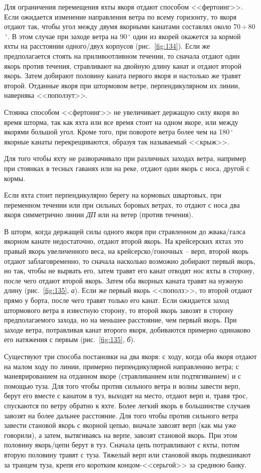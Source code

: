 \documentclass[a4paper, 12pt, twoside, final, book, russian, fittopage, cyremdash]{ncc}
\newcommand{\gr}{\ensuremath{\,^\circ}\xspace}
\newcommand{\otdo}{\,\ensuremath{\div}\,}
\newcommand{\ris}[1]{\ref{fig:#1}}
\begin{document}
Для ограничения перемещения яхты якоря отдают способом <<фертоинг>>. Если ожидается изменение направления ветра по всему горизонту, то якоря отдают так, чтобы угол между двумя якорными канатами составлял около 70\otdo 80\gr. В этом случае при заходе ветра на 90\gr один из якорей окажется за кормой яхты на расстоянии одного\-/двух корпусов (рис.~\ris{134}). Если же предполагается стоять на приливоотливном течении, то сначала отдают один якорь против течения, стравливают на двойную длину канат и отдают второй якорь. Затем добирают половину каната первого якоря и настолько же травят второй. Отданные якоря при штормовом ветре, перпендикулярном их линии, наверняка <<поползут>>.

Стоянка способом <<фертоинг>> не увеличивает держащую силу якоря во время шторма, так как яхта или все время стоит на одном якоре, или между якорями большой угол. Кроме того, при повороте ветра более чем на 180\gr якорные канаты перекрещиваются, образуя так называемый <<крыж>>.

Для того чтобы яхту не разворачивало при различных заходах ветра, например при стоянках в тесных гаванях или на реке, отдают один якорь с носа, другой с кормы.

Если яхта стоит перпендикулярно берегу на кормовых швартовых, при переменном течении или при сильных боровых ветрах, то отдают с носа два якоря симметрично линии \textit{ДП} или на ветер (против течения).

В шторм, когда держащей силы одного якоря при стравленном до жвака\-/галса якорном канате недостаточно, отдают второй якорь. На крейсерских яхтах это правый якорь увеличенного веса, на крейсерско\-/гоночных \--- верп, второй якорь отдают заблаговременно, то сначала насколько возможно добирают первый якорь, но так, чтобы не вырвать его, затем травят его канат отводят нос яхты в сторону, после чего отдают второй якорь. Затем оба якорных каната травят на нужную длину (рис.~\ris{135}, \textit{а}). Если же первый якорь <<пополз>>, то второй отдают прямо у борта, после чего травят только его канат. Если ожидается заход штормового ветра в известную сторону, то второй якорь завозят в сторону предполагаемого захода, но на меньшее расстояние, чем первый якорь. При заходе ветра, потравливая канат второго якоря, добиваются примерно одинаково его натяжения с первым (рис.~\ris{135}, \textit{б}).

Существуют три способа постановки на два якоря: с ходу, когда оба якоря отдают на малом ходу по линии, примерно перпендикулярной направлению ветра; с маневрированием на отданном якоре (стравливанием или подтягиванием) и с помощью туза. Для того чтобы против сильного ветра и волны завести верп, берут его вместе с канатом в туз, выходят на место, отдают верп и, травя трос, спускаются по ветру обратно к яхте. Более легкий якорь в большинстве случаев завозят на более дальнее расстояние. Для того чтобы против сильного ветра завести становой якорь с якорной цепью, вначале завозят верп (как мы уже говорили), а затем, вытягиваясь на верпе, завозят становой якорь. При этом половину якорь\-/цепи берут в туз. Сначала цепь потравливают с яхты, потом вторую половину травят с туза. Тяжелый верп или становой якорь подвешивают за транцем туза, крепя его коротким концом-<<серьгой>> за среднюю банку.
\end{document}
